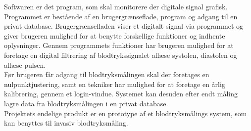 Softwaren er det program, som skal monitorere der digitale signal grafisk. Programmet er bestående af en brugergrænseflade, program og adgang til en privat database. Brugergrænsefladen viser et digitalt signal via programmet og giver brugeren mulighed for at benytte forskellige funktioner og indhente oplysninger. Gennem programmets funktioner har brugeren mulighed for at foretage en digital filtrering af blodtrykssignalet aflæse systolen, diastolen og aflæse pulsen.\\
 Før brugeren får adgang til blodtryksmålingen skal der foretages en nulpunktjustering, samt en tekniker har mulighed for at foretage en årlig kalibrering, gennem et login-vindue. Systemet kan desuden efter endt måling lagre data fra blodtryksmålingen i en privat database.\\[1ex]

Projektets endelige produkt er en prototype af et blodtryksmålings system, som kan benyttes til invasiv blodtryksmåling.


